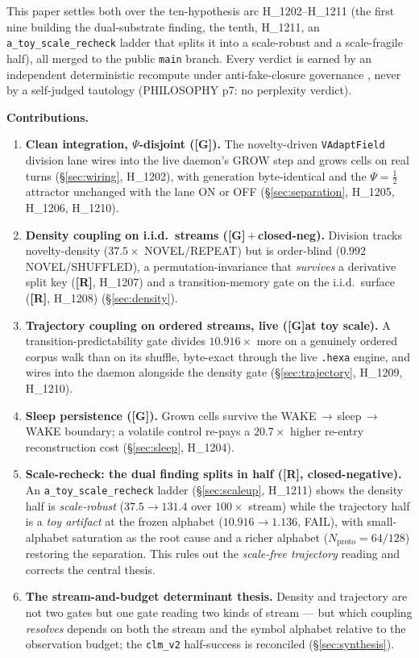 \documentclass[11pt,a4paper]{article}
\providecommand{\tierGreen}{\textbf{[G]}}
\providecommand{\tierRed}{\textbf{[R]}}
\newcommand{\Psihalf}{\Psi=\tfrac12}
\begin{document}
This paper settles both over the ten-hypothesis arc H\_1202--H\_1211 (the first
nine building the dual-substrate finding, the tenth, H\_1211, an
\texttt{a\_toy\_scale\_recheck} ladder that splits it into a scale-robust and a
scale-fragile half), all merged to the public \texttt{main} branch. Every verdict
is earned by an
independent deterministic recompute under anti-fake-closure governance
\citep{anima_g73}, never by a self-judged tautology (PHILOSOPHY p7: no
perplexity verdict).

\medskip
\noindent\textbf{Contributions.}
\begin{enumerate}\itemsep0.3em
\item \textbf{Clean integration, $\Psi$-disjoint (\tierGreen).} The
      novelty-driven \texttt{VAdaptField} division lane wires into the live
      daemon's GROW step and grows cells on real turns
      (\S\ref{sec:wiring}, H\_1202), with generation byte-identical and the
      $\Psihalf$ attractor unchanged with the lane ON or OFF
      (\S\ref{sec:separation}, H\_1205, H\_1206, H\_1210).
\item \textbf{Density coupling on i.i.d.\ streams (\tierGreen\,$+$\,closed-neg).}
      Division tracks novelty-density ($37.5\times$ NOVEL/REPEAT) but is
      order-blind ($0.992$ NOVEL/SHUFFLED), a permutation-invariance that
      \emph{survives} a derivative split key (\tierRed, H\_1207) and a
      transition-memory gate on the i.i.d.\ surface (\tierRed, H\_1208)
      (\S\ref{sec:density}).
\item \textbf{Trajectory coupling on ordered streams, live (\tierGreen at toy
      scale).} A transition-predictability gate divides $10.916\times$ more on a
      genuinely ordered corpus walk than on its shuffle, byte-exact through the
      live \texttt{.hexa} engine, and wires into the daemon alongside the density
      gate (\S\ref{sec:trajectory}, H\_1209, H\_1210).
\item \textbf{Sleep persistence (\tierGreen).} Grown cells survive the
      WAKE\,$\to$\,sleep\,$\to$\,WAKE boundary; a volatile control re-pays a
      $20.7\times$ higher re-entry reconstruction cost (\S\ref{sec:sleep},
      H\_1204).
\item \textbf{Scale-recheck: the dual finding splits in half (\tierRed,
      closed-negative).} An \texttt{a\_toy\_scale\_recheck} ladder
      (\S\ref{sec:scaleup}, H\_1211) shows the density half is
      \emph{scale-robust} ($37.5 \to 131.4$ over $100\times$ stream) while the
      trajectory half is a \emph{toy artifact} at the frozen alphabet
      ($10.916 \to 1.136$, FAIL), with small-alphabet saturation as the root
      cause and a richer alphabet ($N_{\text{proto}}{=}64/128$) restoring the
      separation. This rules out the \emph{scale-free trajectory} reading and
      corrects the central thesis.
\item \textbf{The stream-and-budget determinant thesis.} Density and trajectory
      are not two gates but one gate reading two kinds of stream --- but which
      coupling \emph{resolves} depends on both the stream and the symbol
      alphabet relative to the observation budget; the \texttt{clm\_v2}
      half-success is reconciled (\S\ref{sec:synthesis}).
\end{enumerate}
\end{document}
